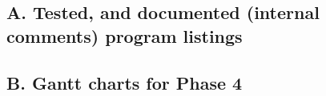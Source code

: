 %
\subsection*{A. Tested, and documented (internal comments) program listings}

\subsection*{B. Gantt charts for Phase 4}
% 
